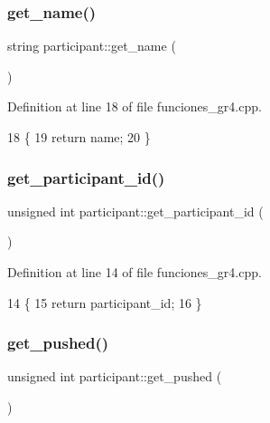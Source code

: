\subsubsection{\texorpdfstring{get\+\_\+name()}{get\_name()}}
{\footnotesize\ttfamily string participant\+::get\+\_\+name (\begin{DoxyParamCaption}{ }\end{DoxyParamCaption})}



Definition at line 18 of file funciones\+\_\+gr4.\+cpp.


\begin{DoxyCode}
18                               \{
19     \textcolor{keywordflow}{return} name;
20 \}
\end{DoxyCode}
\mbox{\label{classparticipant_aa43dcd507d0497ed4609298da5a5d70f}} 
\subsubsection{\texorpdfstring{get\+\_\+participant\+\_\+id()}{get\_participant\_id()}}
{\footnotesize\ttfamily unsigned int participant\+::get\+\_\+participant\+\_\+id (\begin{DoxyParamCaption}{ }\end{DoxyParamCaption})}



Definition at line 14 of file funciones\+\_\+gr4.\+cpp.


\begin{DoxyCode}
14                                               \{
15     \textcolor{keywordflow}{return} participant\_id;
16 \}
\end{DoxyCode}
\mbox{\label{classparticipant_ab72b1560eaa178c674bf13bbb6e17206}} 
\subsubsection{\texorpdfstring{get\+\_\+pushed()}{get\_pushed()}}
{\footnotesize\ttfamily unsigned int participant\+::get\+\_\+pushed (\begin{DoxyParamCaption}{ }\end{DoxyParamCaption})}



